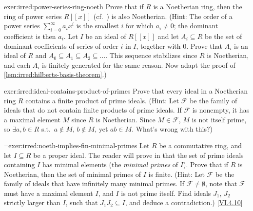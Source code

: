 \begin{exer}{}{exer:irred:power-series-ring-noeth}
  Prove that if $R$ is a Noetherian ring, then the ring of power
  series $R[[x]]$ (cf.~) is
  also Noetherian. (Hint: The order of a power series
  $\sum_{i=0}^{\infty} a_i x^i$ is the smallest $i$ for which
  $a_i \neq 0$; the dominant coefficient is then $a_i$. Let $I$ be an
  ideal of $R[[x]]$ and let $A_i \subseteq R$ be the set of dominant
  coefficients of series of order $i$ in $I$, together with $0$. Prove
  that $A_i$ is an ideal of $R$ and
  $A_0 \subseteq A_1 \subseteq A_2 \subseteq \dots$. This
  sequence stabilizes since $R$ is Noetherian, and each $A_i$ is
  finitely generated for the same reason. Now adapt the proof of
  \cref{lem:irred:hilberts-basis-theorem}.)
\end{exer}
\begin{exer}{}{exer:irred:ideal-contains-product-of-primes}
  Prove that every ideal in a Noetherian ring $R$ contains a finite
  product of prime ideals. (Hint: Let $\mathscr{F}$ be the family of
  ideals that do not contain finite products of prime ideals. If
  $\mathscr{F}$ is nonempty, it has a maximal element $M$ since $R$ is
  Noetherian. Since $M \in \mathscr{F}$, $M$ is not itself prime, so
  $\exists a, b \in R$ s.t.\ $a \notin M$, $b \notin M$, yet
  $ab \in M$. What's wrong with this?)
\end{exer}
\begin{exer}{$\lnot$}{exer:irred:noeth-implies-fin-minimal-primes}
  Let $R$ be a commutative ring, and let $I \subseteq R$ be a proper
  ideal.  The reader will prove in
   that the set of prime ideals
  containing $I$ has minimal elements (the \emph{minimal primes} of
  $I$).  Prove that if $R$ is Noetherian, then the set of minimal
  primes of $I$ is finite. (Hint: Let $\mathscr{F}$ be the family of
  ideals that have infinitely many minimal primes. If
  $\mathscr{F} \neq \emptyset$, note that $\mathscr{F}$ must have a
  maximal element $I$, and $I$ is not prime itself.  Find ideals
  $J_1$, $J_2$ strictly larger than $I$, such that
  $J_1 J_2 \subseteq I$, and deduce a contradiction.)
  [\hyperref[exer:linalg:intersection-of-assoc-primes-eq-nilradical]{VI.4.10}]
\end{exer}

